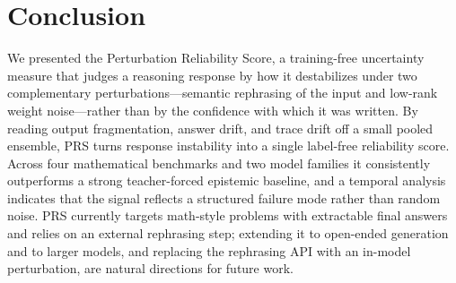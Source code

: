 \documentclass{article} %
\begin{document}
\section{Conclusion}
\label{sec:conclusion}

We presented the Perturbation Reliability Score, a training-free uncertainty
measure that judges a reasoning response by how it destabilizes under two
complementary perturbations---semantic rephrasing of the input and low-rank
weight noise---rather than by the confidence with which it was written. By
reading output fragmentation, answer drift, and trace drift off a small pooled
ensemble, PRS turns response instability into a single label-free reliability
score. Across four mathematical benchmarks and two model families it
consistently outperforms a strong teacher-forced epistemic baseline, and a
temporal analysis indicates that the signal reflects a structured failure mode
rather than random noise. PRS currently targets math-style problems with
extractable final answers and relies on an external rephrasing step; extending it
to open-ended generation and to larger models, and replacing the rephrasing API
with an in-model perturbation, are natural directions for future work.


% 
% 

\end{document}
